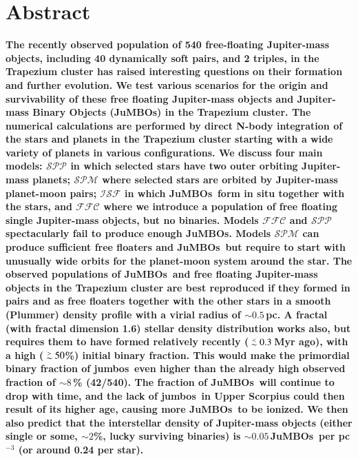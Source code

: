 \documentclass[submission,phys]{lib/SciPost}
\def\apgt{\ {\raise-.5ex\hbox{$\buildrel>\over\sim$}}\ }
\def\aplt{\ {\raise-.5ex\hbox{$\buildrel<\over\sim$}}\ }
\newcommand{\jumbos}{\mbox{JuMBOs}}
\begin{document}
\section*{Abstract} {\bf 
      The recently observed population of 540 free-floating
      Jupiter-mass objects, including 40 dynamically soft pairs, and 2
      triples, in the Trapezium cluster has raised interesting
      questions on their formation and further evolution.  We test
      various scenarios for the origin and survivability of these free
      floating Jupiter-mass objects and Jupiter-mass Binary Objects
      (JuMBOs) in the Trapezium cluster.  The numerical calculations
      are performed by direct N-body integration of the stars and
      planets in the Trapezium cluster starting with a wide variety of
      planets in various configurations. We discuss four main models:
      $\mathcal{SPP}$ in which selected stars have two outer orbiting
      Jupiter-mass planets; $\mathcal{SPM}$ where selected stars are
      orbited by Jupiter-mass planet-moon pairs; $\mathcal{ISF}$ in
      which \jumbos\, form in situ together with the stars, and
      $\mathcal{FFC}$ where we introduce a population of free floating
      single Jupiter-mass objects, but no binaries.  Models
      $\mathcal{FFC}$ and $\mathcal{SPP}$ spectacularly fail to
      produce enough \jumbos. Models $\mathcal{SPM}$ can produce
      sufficient free floaters and \jumbos\, but require to start with
      unusually wide orbits for the planet-moon system around the
      star. The observed populations of \jumbos\, and free floating
      Jupiter-mass objects in the Trapezium cluster are best
      reproduced if they formed in pairs and as free floaters together
      with the other stars in a smooth (Plummer) density profile with
      a virial radius of $\sim 0.5$\,pc.  A fractal (with fractal
      dimension 1.6) stellar density distribution works also, but
      requires them to have formed relatively recently ($\aplt
      0.3$\,Myr ago), with a high ($\apgt 50$\%) initial binary
      fraction.  This would make the primordial binary fraction of
      jumbos\, even higher than the already high observed fraction of
      $\sim 8$\,\% (42/540). The fraction of \jumbos\, will continue
      to drop with time, and the lack of jumbos\, in Upper Scorpius
      could then result of its higher age, causing more \jumbos\, to
      be ionized. We then also predict that the interstellar density
      of Jupiter-mass objects (either single or some, $\sim 2$\%,
      lucky surviving binaries) is $\sim 0.05$\,\jumbos\, per
      pc$^{-3}$ (or around 0.24 per star).  }
\end{document}
